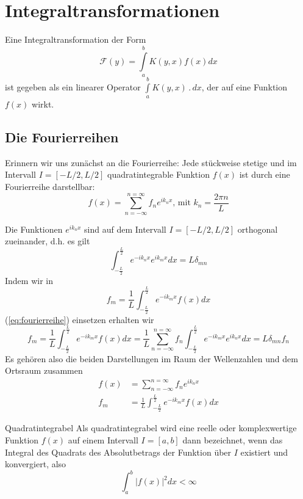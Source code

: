 \chapter{Integraltransformationen}
Eine Integraltransformation der Form
\begin{equation}
  \mathcal{F}(y)=\int\limits_a^bK(y,x)f(x)dx
  \label{eq:IntTrafo}
\end{equation}
ist gegeben als ein linearer Operator $\int\limits_a^bK(y,x)\,.\,dx$, der auf
eine Funktion $f(x)$ wirkt.
\section{Die Fourierreihen}
Erinnern wir uns zunächst an die Fourierreihe: Jede stückweise stetige und im
Intervall $I=[-L/2,L/2]$ quadratintegrable Funktion $f(x)$ ist durch eine
Fourierreihe darstellbar:
\begin{equation}\label{eq:fourierreihe}
f(x)=\sum_{n=-\infty}^{n=\infty}f_n e^{ik_n x}\mbox{, mit }k_n=\frac{2\pi n}{L}
\end{equation}

Die Funktionen $e^{ik_nx}$ sind auf dem Intervall $I=[-L/2,L/2]$ orthogonal zueinander, d.h.
es gilt
\[ \int_{-\frac{L}{2}}^{\frac{L}{2}}e^{-ik_nx}e^{ik_mx}dx=L\delta_{mn}\]
Indem wir in
\begin{equation}\label{eq:fm}
f_m=\frac{1}{L}\int_{-\frac{L}{2}}^{\frac{L}{2}}e^{-ik_mx}f(x)dx
\end{equation}
(\ref{eq:fourierreihe}) einsetzen erhalten wir 
\begin{equation}\label{eq:fm}
f_m=\frac{1}{L}\int_{-\frac{L}{2}}^{\frac{L}{2}}e^{-ik_mx}f(x)dx=\frac{1}{L}
\sum_{n=-\infty}^{n=\infty}f_n\int_{-\frac{L}{2}}^{\frac{L}{2}}e^{-ik_mx}e^{ik_nx}dx
=L\delta_{mn}f_n
\end{equation}
Es gehören also die beiden Darstellungen im Raum der Wellenzahlen und dem Ortsraum zusammen
\begin{align}
  f(x)&=\sum_{n=-\infty}^{n=\infty}f_n e^{ik_n x}\\
f_m&=\frac{1}{L}\int_{-\frac{L}{2}}^{\frac{L}{2}}e^{-ik_mx}f(x)dx
\end{align}
\begin{note}{Quadratintegrabel}
Als quadratintegrabel wird eine reelle oder komplexwertige Funktion $f(x)$ auf
einem Intervall $I=[a,b]$ dann bezeichnet, wenn das Integral des Quadrats des
Absolutbetrags der Funktion über $I$ existiert und konvergiert, also
\[\int_a^b |f(x)|^2dx<\infty\]
\end{note}
%

